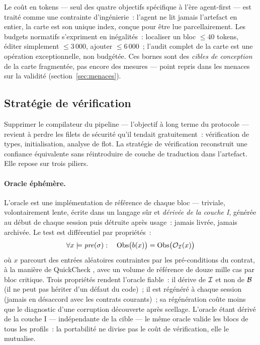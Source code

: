 Le coût en tokens — seul des quatre objectifs spécifique à l’ère agent-first
— est traité comme une contrainte d’ingénierie~: l’agent ne lit jamais
l’artefact en entier, la carte est son unique index, conçue pour être lue
parcellairement. Les budgets normatifs s’expriment en inégalités~:
localiser un bloc $\leq 40$ tokens, éditer simplement $\leq 3\,000$,
ajouter $\leq 6\,000$~; l’audit complet de la carte est une opération
exceptionnelle, non budgétée. Ces bornes sont des \emph{cibles de
conception} de la carte fragmentée, pas encore des mesures — point
repris dans les menaces sur la validité (section~\ref{sec:menaces}).

\subsection{Stratégie de vérification}\label{sec:verification}

Supprimer le compilateur du pipeline — l’objectif à long terme du
protocole — revient à perdre les filets de sécurité qu’il tendait
gratuitement~: vérification de types, initialisation, analyse de flot. La
stratégie de vérification reconstruit une confiance équivalente sans
réintroduire de couche de traduction dans l’artefact. Elle repose sur
trois piliers.

\paragraph{Oracle éphémère.}
L’oracle est une implémentation de référence de chaque bloc — triviale,
volontairement lente, écrite dans un langage sûr et \emph{dérivée de la
couche I}, générée au début de chaque session puis détruite après usage~:
jamais livrée, jamais archivée. Le test est différentiel par
propriétés~:
\begin{equation}\label{eq:oracle}
\forall x \models \mathit{pre}(\sigma) :\quad
\mathrm{Obs}\bigl(b(x)\bigr) = \mathrm{Obs}\bigl(\mathcal{O}_{\mathcal{I}}(x)\bigr)
\end{equation}
où $x$ parcourt des entrées aléatoires contraintes par les pré-conditions
du contrat, à la manière de QuickCheck \cite{claessen2000}, avec un volume
de référence de douze mille cas par bloc critique. Trois propriétés
rendent l’oracle fiable~: il dérive de $\mathcal{I}$ et non de $\mathcal{B}$ (il ne peut
pas hériter d’un défaut du code)~; il est régénéré à chaque session (jamais
en désaccord avec les contrats courants)~; sa régénération coûte moins que
le diagnostic d’une corruption découverte après scellage. L’oracle étant
dérivé de la couche I — indépendante de la cible — le même oracle valide
les blocs de tous les profils~: la portabilité ne divise pas le coût de
vérification, elle le mutualise.

